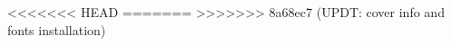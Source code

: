 
%


<<<<<<< HEAD
\ntmemoirsetup{11pt}   %
=======
>>>>>>> 8a68ec7 (UPDT: cover info and fonts installation)

